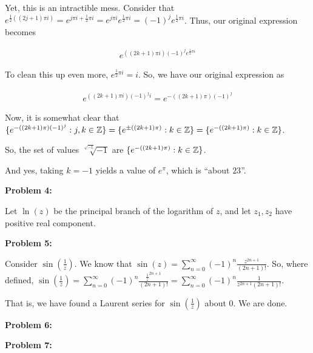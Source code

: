 \documentclass[a4paper,12pt]{article}
\begin{document}
Yet, this is an intractible mess. Consider that $e^{\frac{1}{2}((2j+1)\pi i)} = e^{j \pi i + \frac{1}{2} \pi i} = e^{j\pi i} e^{\frac{1}{2} \pi i} = (-1)^j e^{\frac{1}{2} \pi i}$. Thus, our original expression becomes

\begin{align*}
e^{((2k+1)\pi i)(-1)^j e^{\frac{1}{2} \pi i}} 
\end{align*}

To clean this up even more, $e^{\frac{1}{2} \pi i}=i$. So, we have our original expression as 

\begin{align*}
e^{((2k+1)\pi i)(-1)^j i}  = e^{-((2k+1)\pi)(-1)^j}
\end{align*}

Now, it is somewhat clear that $\{e^{-((2k+1)\pi)(-1)^j}: j, k \in \mathbb{Z} \} = \{ e^{ \pm ((2k+1)\pi)}: k \in \mathbb{Z} \} = \{e^{-((2k+1)\pi)}: k \in \mathbb{Z} \}$.

So, the set of values $\sqrt[\sqrt{-1}]{-1}$ are $\{e^{-((2k+1)\pi)}: k \in \mathbb{Z} \}$. 

And yes, taking $k=-1$ yields a value of $e^\pi$, which is ``about $23$''.

\shunt

{\bf Problem 4:}

Let $\ln(z)$ be the principal branch of the logarithm of $z$, and let $z_1, z_2$ have positive real component.

\shunt

{\bf Problem 5:}

Consider $\sin(\frac{1}{z})$. We know that $\sin(z) = \sum\limits_{n=0}^\infty (-1)^n \frac{z^{2n+1}}{(2n+1)!}$. So, where defined, $\sin(\frac{1}{z}) = \sum\limits_{n=0}^\infty (-1)^n \frac{\frac{1}{z}^{2n+1}}{(2n+1)!} = \sum\limits_{n=0}^\infty (-1)^n \frac{1}{z^{2n+1}(2n+1)!}$.

That is, we have found a Laurent series for $\sin(\frac{1}{z})$ about $0$. We are done.

\shunt

{\bf Problem 6:}

\shunt

{\bf Problem 7:}

\shunt
\end{document}

